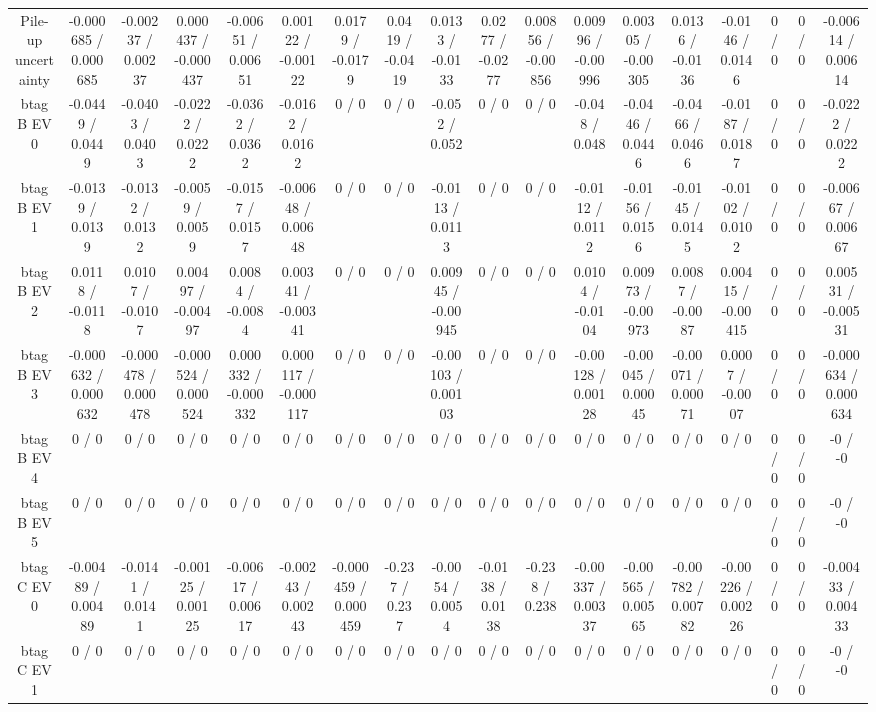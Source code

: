 \documentclass[10pt]{article}
\begin{document}
\begin{table}[htbp]
\begin{center}
\begin{tabular}{|c|c|c|c|c|c|c|c|c|c|c|c|c|c|c|c|c|c|}
  Pile-up uncertainty & -0.000685 / 0.000685 & -0.00237 / 0.00237 & 0.000437 / -0.000437 & -0.00651 / 0.00651 & 0.00122 / -0.00122 & 0.0179 / -0.0179 & 0.0419 / -0.0419 & 0.0133 / -0.0133 & 0.0277 / -0.0277 & 0.00856 / -0.00856 & 0.00996 / -0.00996 & 0.00305 / -0.00305 & 0.0136 / -0.0136 & -0.0146 / 0.0146 & 0 / 0 & 0 / 0 & -0.00614 / 0.00614 \\ 
  btag B EV 0 & -0.0449 / 0.0449 & -0.0403 / 0.0403 & -0.0222 / 0.0222 & -0.0362 / 0.0362 & -0.0162 / 0.0162 & 0 / 0 & 0 / 0 & -0.052 / 0.052 & 0 / 0 & 0 / 0 & -0.048 / 0.048 & -0.0446 / 0.0446 & -0.0466 / 0.0466 & -0.0187 / 0.0187 & 0 / 0 & 0 / 0 & -0.0222 / 0.0222 \\ 
  btag B EV 1 & -0.0139 / 0.0139 & -0.0132 / 0.0132 & -0.0059 / 0.0059 & -0.0157 / 0.0157 & -0.00648 / 0.00648 & 0 / 0 & 0 / 0 & -0.0113 / 0.0113 & 0 / 0 & 0 / 0 & -0.0112 / 0.0112 & -0.0156 / 0.0156 & -0.0145 / 0.0145 & -0.0102 / 0.0102 & 0 / 0 & 0 / 0 & -0.00667 / 0.00667 \\ 
  btag B EV 2 & 0.0118 / -0.0118 & 0.0107 / -0.0107 & 0.00497 / -0.00497 & 0.0084 / -0.0084 & 0.00341 / -0.00341 & 0 / 0 & 0 / 0 & 0.00945 / -0.00945 & 0 / 0 & 0 / 0 & 0.0104 / -0.0104 & 0.00973 / -0.00973 & 0.0087 / -0.0087 & 0.00415 / -0.00415 & 0 / 0 & 0 / 0 & 0.00531 / -0.00531 \\ 
  btag B EV 3 & -0.000632 / 0.000632 & -0.000478 / 0.000478 & -0.000524 / 0.000524 & 0.000332 / -0.000332 & 0.000117 / -0.000117 & 0 / 0 & 0 / 0 & -0.00103 / 0.00103 & 0 / 0 & 0 / 0 & -0.00128 / 0.00128 & -0.00045 / 0.00045 & -0.00071 / 0.00071 & 0.0007 / -0.0007 & 0 / 0 & 0 / 0 & -0.000634 / 0.000634 \\ 
  btag B EV 4 & 0 / 0 & 0 / 0 & 0 / 0 & 0 / 0 & 0 / 0 & 0 / 0 & 0 / 0 & 0 / 0 & 0 / 0 & 0 / 0 & 0 / 0 & 0 / 0 & 0 / 0 & 0 / 0 & 0 / 0 & 0 / 0 & -0 / -0 \\ 
  btag B EV 5 & 0 / 0 & 0 / 0 & 0 / 0 & 0 / 0 & 0 / 0 & 0 / 0 & 0 / 0 & 0 / 0 & 0 / 0 & 0 / 0 & 0 / 0 & 0 / 0 & 0 / 0 & 0 / 0 & 0 / 0 & 0 / 0 & -0 / -0 \\ 
  btag C EV 0 & -0.00489 / 0.00489 & -0.0141 / 0.0141 & -0.00125 / 0.00125 & -0.00617 / 0.00617 & -0.00243 / 0.00243 & -0.000459 / 0.000459 & -0.237 / 0.237 & -0.0054 / 0.0054 & -0.0138 / 0.0138 & -0.238 / 0.238 & -0.00337 / 0.00337 & -0.00565 / 0.00565 & -0.00782 / 0.00782 & -0.00226 / 0.00226 & 0 / 0 & 0 / 0 & -0.00433 / 0.00433 \\ 
  btag C EV 1 & 0 / 0 & 0 / 0 & 0 / 0 & 0 / 0 & 0 / 0 & 0 / 0 & 0 / 0 & 0 / 0 & 0 / 0 & 0 / 0 & 0 / 0 & 0 / 0 & 0 / 0 & 0 / 0 & 0 / 0 & 0 / 0 & -0 / -0 \\ 

\end{tabular}
\end{center}
\end{table}
\end{document}
